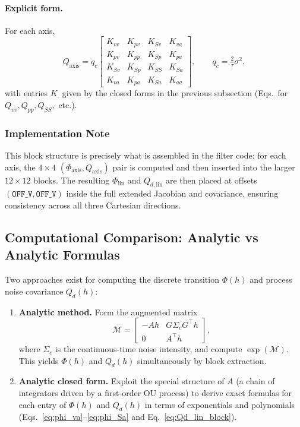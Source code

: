 \documentclass[10pt]{extarticle}
\begin{document}
\paragraph{Explicit form.}
For each axis,
\[
Q_{\mathrm{axis}} =
q_c \begin{bmatrix}
K_{vv} & K_{pv} & K_{Sv} & K_{va} \\
K_{pv} & K_{pp} & K_{Sp} & K_{pa} \\
K_{Sv} & K_{Sp} & K_{SS} & K_{Sa} \\
K_{va} & K_{pa} & K_{Sa} & K_{aa}
\end{bmatrix}, \qquad
q_c = \tfrac{2}{\tau}\sigma^2,
\]
with entries $K_{\cdot}$ given by the closed forms in the previous
subsection (Eqs.~for $Q_{vv}, Q_{pp}, Q_{SS},$ etc.).

\subsubsection{Implementation Note}

This block structure is precisely what is assembled in the filter code:
for each axis, the $4\times 4$ $(\Phi_{\mathrm{axis}},Q_{\mathrm{axis}})$
pair is computed and then inserted into the larger $12\times 12$ blocks.
The resulting $\Phi_{\mathrm{lin}}$ and $Q_{d,\mathrm{lin}}$ are then
placed at offsets $(\texttt{OFF\_V},\texttt{OFF\_V})$ inside the full
extended Jacobian and covariance, ensuring consistency across all three
Cartesian directions.

\subsection{Computational Comparison: Analytic vs Analytic Formulas}

Two approaches exist for computing the discrete transition
$\Phi(h)$ and process noise covariance $Q_d(h)$:

\begin{enumerate}
  \item \textbf{Analytic method.}  
  Form the augmented matrix
  \[
  \mathcal{M} =
  \begin{bmatrix}
    -A h & G \Sigma_c G^\top h \\
    0    & A^\top h
  \end{bmatrix},
  \]
  where $\Sigma_c$ is the continuous-time noise intensity,
  and compute $\exp(\mathcal{M})$. This yields $\Phi(h)$ and $Q_d(h)$
  simultaneously by block extraction.

  \item \textbf{Analytic closed form.}  
  Exploit the special structure of $A$ (a chain of integrators driven by
  a first-order OU process) to derive exact formulas for each entry
  of $\Phi(h)$ and $Q_d(h)$ in terms of exponentials and polynomials
  (Eqs.~\eqref{eq:phi_va}--\eqref{eq:phi_Sa} and
  Eq.~\eqref{eq:Qd_lin_block}).
\end{enumerate}
\end{document}
